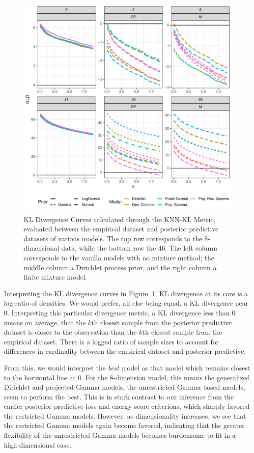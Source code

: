 \begin{figure}[h]
  \centering
  \label{fig:knnkl}
  \includegraphics[width = 5in]{./images/kl_divergence_curves}
  \caption{KL Divergence Curves calculated through the KNN-KL Metric, evaluated between the empirical
  dataset and posterior predictive datasets of various models.  The top row corresponds to the
  8-dimensional data, while the bottom row the 46.  The left column corresponds to the vanilla models
  with no mixture method; the middle column a Dirichlet process prior, and the right column a finite
  mixture model.}
\end{figure}

Interpreting the KL divergence curves in Figure~\ref{fig:knnkl}, KL divergence at its core is a
  log-ratio of densities.  We would prefer, all else being equal, a KL divergence near 0.
  Interpreting this particular divergence metric, a KL divergence less than 0 means on average,
  that the $k$th closest sample from the posterior predictive dataset is closer to the observation
  than the $k$th closest sample from the empirical dataset.  There is a logged ratio of sample sizes
  to account for differences in cardinality between the empirical dataset and posterior predictive.

From this, we would interpret the \emph{best} model as that model which remains closest to the
  horizontal line at $0$.  For the 8-dimension model, this means the generalized Dirichlet and
  projected Gamma models, the unrestricted Gamma based models, seem to perform the best.   This is
  in stark contrast to our inference from the earlier posterior predictive loss and energy score
  criterions, which sharply favored the restricted Gamma models.  However, as dimensionality
  increases, we see that the restricted Gamma models again become favored, indicating that the
  greater flexibility of the unrestricted Gamma models becomes burdensome to fit in a
  high-dimensional case.



